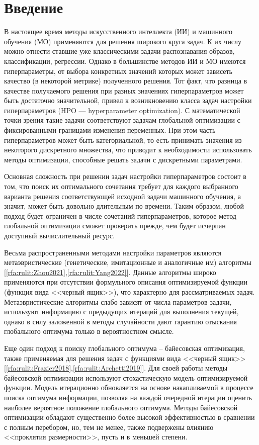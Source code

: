 \documentclass[a4paper,12pt,russian]{article}
\begin{document}
\section{Введение}


В настоящее время методы искусственного интеллекта (ИИ) и машинного обучения (МО) применяются для решения широкого круга задач. К их числу можно отнести ставшие уже классическими задачи распознавания образов, классификации, регрессии. 
Однако в большинстве методов ИИ и МО имеются гиперпараметры, от выбора конкретных значений которых может зависеть качество (в некоторой метрике) полученного решения. Тот факт, что разница в качестве получаемого решения при разных значениях гиперпараметров может быть достаточно значительной, привел к возникновению класса задач настройки гиперпараметров (HPO --- hyperparameter optimization). С математической точки зрения такие задачи соответствуют задачам глобальной оптимизации с фиксированными границами изменения переменных. При этом часть гиперпараметров может быть категориальной, то есть принимать значения из некоторого дискретного множества, что приводит к необходимости использовать методы оптимизации, способные решать задачи с дискретными параметрами.

Основная сложность при решении  задач настройки гиперпараметров состоит  в  том, что поиск их оптимального сочетания требует для каждого выбранного варианта решения соответствующей исходной задачи машинного обучения, а значит, может быть довольно длительным по времени. Таким образом, любой подход будет ограничен в числе сочетаний гиперпараметров, которое метод глобальной оптимизации сможет проверить прежде, чем будет исчерпан доступный вычислительный ресурс. 

Весьма распространенными методами настройки параметров являются метаэвристические (генетические, имитационные и аналогичные им) алгоритмы [\ref{rfa:rulit:Zhou2021},\ref{rfa:rulit:Yang2022}]. Данные алгоритмы широко применяются при отсутствии формульного описания оптимизируемой функции (функция вида <<черный ящик>>), что характерно для рассматриваемых задач. Метаэвристические алгоритмы слабо зависят от числа параметров задачи, используют информацию с предыдущих итераций для выполнения текущей, однако в силу заложенной в методы случайности дают гарантию отыскания глобального оптимума только в вероятностном смысле.

Еще один подход к поиску глобального оптимума -- байесовская оптимизация, также применяемая для решения задач с функциями вида <<черный ящик>> [\ref{rfa:rulit:Frazier2018},\ref{rfa:rulit:Archetti2019}]. Для своей работы методы байесовской оптимизации используют стохастическую модель оптимизируемой функции. Модель итерационно  обновляется на основе накапливаемой в процессе поиска оптимума информации, позволяя на каждой очередной итерации оценить наиболее вероятное положение глобального оптимума. Методы байесовской оптимизации обладают существенно  более  высокой  эффективностью  в  сравнении с полным перебором, но, тем не менее, также подвержены влиянию <<проклятия размерности>>, пусть и в меньшей степени.
\end{document}
